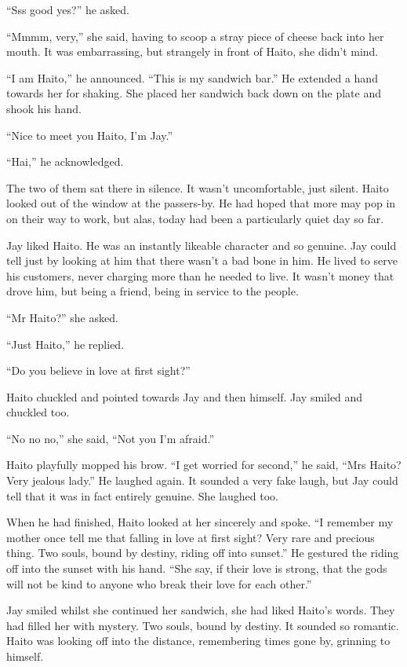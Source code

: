 ``Sss good yes?'' he asked.

``Mmmm, very,'' she said, having to scoop a stray piece of cheese back into her mouth.  It was embarrassing, but strangely in front of Haito, she didn't mind.  

``I am Haito,'' he announced.  ``This is my sandwich bar.''  He extended a hand towards her for shaking.  She placed her sandwich back down on the plate and shook his hand.

``Nice to meet you Haito, I'm Jay.''

``Hai,'' he acknowledged.

The two of them sat there in silence.  It wasn't uncomfortable, just silent.  Haito looked out of the window at the passers-by.  He had hoped that more may pop in on their way to work, but alas, today had been a particularly quiet day so far.

Jay liked Haito.  He was an instantly likeable character and so genuine.  Jay could tell just by looking at him that there wasn't a bad bone in him.  He lived to serve his customers, never charging more than he needed to live.  It wasn't money that drove him, but being a friend, being in service to the people.

``Mr Haito?'' she asked.

``Just Haito,'' he replied.

``Do you believe in love at first sight?''

Haito chuckled and pointed towards Jay and then himself.  Jay smiled and chuckled too.

``No no no,'' she said, ``Not you I'm afraid.''

Haito playfully mopped his brow.  ``I get worried for second,'' he said, ``Mrs Haito?  Very jealous lady.''  He laughed again.  It sounded a very fake laugh, but Jay could tell that it was in fact entirely genuine.  She laughed too.  

When he had finished, Haito looked at her sincerely and spoke.  ``I remember my mother once tell me that falling in love at first sight?  Very rare and precious thing.  Two souls, bound by destiny, riding off into sunset.''  He gestured the riding off into the sunset with his hand.  ``She say, if their love is strong, that the gods will not be kind to anyone who break their love for each other.''

Jay smiled whilst she continued her sandwich, she had liked Haito's words.  They had filled her with mystery.  Two souls, bound by destiny.  It sounded so romantic.  Haito was looking off into the distance, remembering times gone by, grinning to himself.

